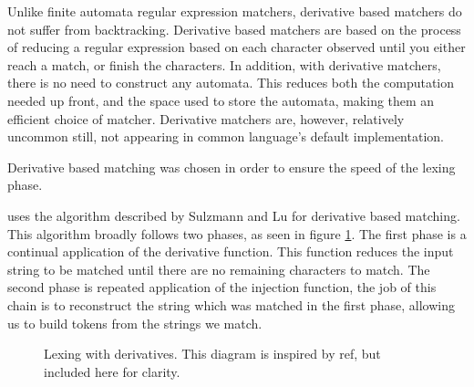 Unlike finite automata regular expression matchers, derivative based matchers do not suffer from backtracking. Derivative based matchers are based on the process of reducing a regular expression based on each character observed until you either reach a match, or finish the characters.  
In addition, with derivative matchers, there is no need to construct any automata. This reduces both the computation needed up front, and the space used to store the automata, making them an efficient choice of matcher. 
Derivative matchers are, however, relatively uncommon still, not appearing in common language's default implementation. 


Derivative based matching was chosen in order to ensure the speed of the lexing phase.

\rimp uses the algorithm described by Sulzmann and Lu for derivative based matching.  
This algorithm broadly follows two phases, as seen in figure \ref{fig:lexing}. The first phase is a continual application of the derivative function. This function reduces the input string to be matched until there are no remaining characters to match. The second phase is repeated application of the injection function, the job of this chain is to reconstruct the string which was matched in the first phase, allowing us to build tokens from the strings we match.

\begin{center}
\begin{figure}[hbt!]
\centering
{}
\caption{Lexing with derivatives. This diagram is inspired by ref, but included here for clarity.}
\label{fig:lexing}
\end{figure}
\end{center}

